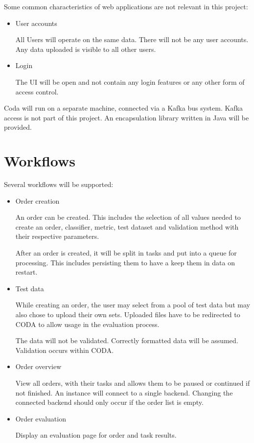 \documentclass[12pt,a4paper,titlepage,oneside,BCOR1cm]{scrreprt}
\begin{document}
Some common characteristics of web applications are not relevant in this project:
\begin{itemize}
  \item User accounts

  All Users will operate on the same data. There will not be any user accounts. Any data uploaded is visible to all other users.
  \item Login

  The UI will be open and not contain any login features or any other form of access control.
\end{itemize}

Coda will run on a separate machine, connected via a Kafka bus system. Kafka access is not part of this project. An encapsulation library written in Java will be provided.

\section{Workflows}

Several workflows will be supported:
\begin{itemize}
  \item Order creation

  An order can be created. This includes the selection of all values needed to create an order, classifier, metric, test dataset and validation method with their respective parameters.

  After an order is created, it will be split in tasks and put into a queue for processing. This includes persisting them to have a keep them in data on restart.

  \item Test data

  While creating an order, the user may select from a pool of test data but may also chose to upload their own sets. Uploaded files have to be redirected to CODA to allow usage in the evaluation process.

  The data will not be validated. Correctly formatted data will be assumed. Validation occurs within CODA.

  \item Order overview

  View all orders, with their tasks and allows them to be paused or continued if not finished. An instance will connect to a single backend. Changing the connected backend should only occur if the order list is empty.

  \item Order evaluation
  
  Display an evaluation page for order and task results.
\end{itemize}
\end{document}
